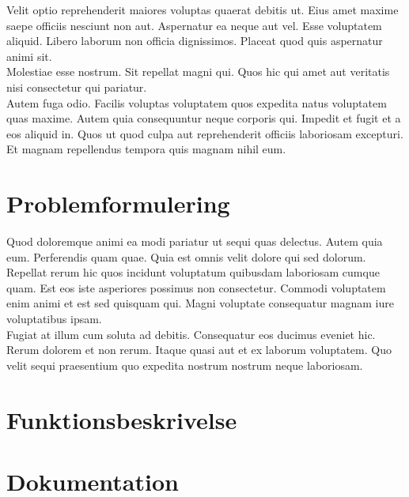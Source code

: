 \documentclass[12pt]{article}
\begin{document}
Velit optio reprehenderit maiores voluptas quaerat debitis ut. Eius amet maxime saepe officiis nesciunt non aut. Aspernatur ea neque aut vel. Esse voluptatem aliquid. Libero laborum non officia dignissimos. Placeat quod quis aspernatur animi sit.
\\
Molestiae esse nostrum. Sit repellat magni qui. Quos hic qui amet aut veritatis nisi consectetur qui pariatur.
\\
Autem fuga odio. Facilis voluptas voluptatem quos expedita natus voluptatem quas maxime. Autem quia consequuntur neque corporis qui. Impedit et fugit et a eos aliquid in. Quos ut quod culpa aut reprehenderit officiis laboriosam excepturi. Et magnam repellendus tempora quis magnam nihil eum.

\section{Problemformulering}

Quod doloremque animi ea modi pariatur ut sequi quas delectus. Autem quia eum. Perferendis quam quae. Quia est omnis velit dolore qui sed dolorum.
\\
Repellat rerum hic quos incidunt voluptatum quibusdam laboriosam cumque quam. Est eos iste asperiores possimus non consectetur. Commodi voluptatem enim animi et est sed quisquam qui. Magni voluptate consequatur magnam iure voluptatibus ipsam.
\\
Fugiat at illum cum soluta ad debitis. Consequatur eos ducimus eveniet hic. Rerum dolorem et non rerum. Itaque quasi aut et ex laborum voluptatem. Quo velit sequi praesentium quo expedita nostrum nostrum neque laboriosam.

\vfill
\pagebreak

\section{Funktionsbeskrivelse}

\vfill
\pagebreak

\section{Dokumentation}
\end{document}
